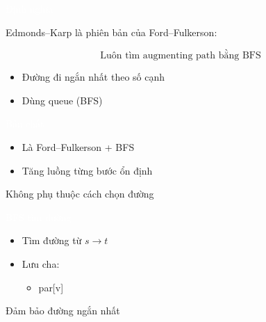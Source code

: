 \documentclass{beamer}
\title{\hlred{Edmonds–Karp Algorithm}}
\author{Group 3}
\date{\hlcyan{03/2026}}
\newcommand{\hlblue}[1]{\textcolor{myblue}{#1}}
\newcommand{\hlgreen}[1]{\textcolor{mygreen}{#1}}
\newcommand{\hlpurple}[1]{\textcolor{mypurple}{#1}}
\newcommand{\hlcyan}[1]{\textcolor{mycyan}{#1}}
\newcommand{\hlwhite}[1]{\textcolor{white}{#1}}
\begin{document}
\frame{\titlepage}


\begin{frame}{\hlwhite{Định nghĩa}}
\begin{tcolorbox}[title=\textbf{\hlwhite{Ý tưởng}}]
\hlblue{Edmonds–Karp} là phiên bản của Ford–Fulkerson:

\[
\text{Luôn tìm augmenting path bằng BFS}
\]
\end{tcolorbox}

\begin{itemize}
\item Đường đi ngắn nhất theo số cạnh
\item Dùng \hlgreen{queue (BFS)}
\end{itemize}
\end{frame}


\begin{frame}{\hlwhite{Bản chất}}
\begin{itemize}
\item Là \hlblue{Ford–Fulkerson + BFS}
\item Tăng luồng từng bước ổn định
\end{itemize}

\begin{tcolorbox}
\centering
\hlpurple{Không phụ thuộc cách chọn đường}
\end{tcolorbox}
\end{frame}


\begin{frame}{\hlwhite{BFS tìm đường}}
\begin{itemize}
\item Tìm đường từ $s \rightarrow t$
\item Lưu cha:
\begin{itemize}
\item \hlblue{par[v]}
\end{itemize}
\end{itemize}

\begin{tcolorbox}
\centering
\hlcyan{Đảm bảo đường ngắn nhất}
\end{tcolorbox}
\end{frame}

\end{document}
